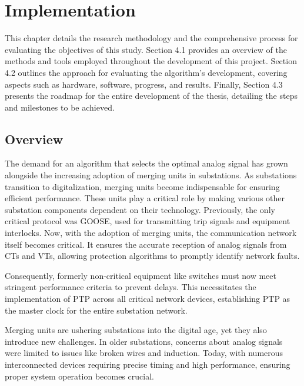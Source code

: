 
\chapter{Implementation} %

\label{chap:Chapter4} %

This chapter details the research methodology and the comprehensive process for evaluating the objectives of this study. Section 4.1 provides an overview of the methods and tools employed throughout the development of this project. Section 4.2 outlines the approach for evaluating the algorithm's development, covering aspects such as hardware, software, progress, and results. Finally, Section 4.3 presents the roadmap for the entire development of the thesis, detailing the steps and milestones to be achieved.

\section{Overview}

The demand for an algorithm that selects the optimal analog signal has grown alongside the increasing adoption of merging units in substations. As substations transition to digitalization, merging units become indispensable for ensuring efficient performance. These units play a critical role by making various other substation components dependent on their technology. Previously, the only critical protocol was GOOSE, used for transmitting trip signals and equipment interlocks. Now, with the adoption of merging units, the communication network itself becomes critical. It ensures the accurate reception of analog signals from CTs and VTs, allowing protection algorithms to promptly identify network faults.

Consequently, formerly non-critical equipment like switches must now meet stringent performance criteria to prevent delays. This necessitates the implementation of PTP across all critical network devices, establishing PTP as the master clock for the entire substation network.

Merging units are ushering substations into the digital age, yet they also introduce new challenges. In older substations, concerns about analog signals were limited to issues like broken wires and induction. Today, with numerous interconnected devices requiring precise timing and high performance, ensuring proper system operation becomes crucial.

